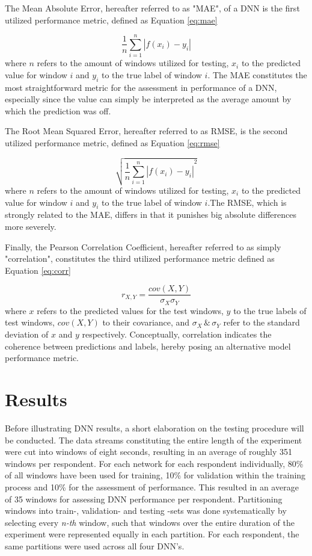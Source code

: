 \documentclass[12pt]{article}
\begin{document}
The Mean Absolute Error, hereafter referred to as "MAE",  of a DNN is the first utilized performance metric, defined as Equation \ref{eq:mae}

\begin{equation}
\label{eq:mae}
\frac{1}{n} \sum^n_{i=1}|f(x_i)-y_i| 
\end{equation}
where $n$ refers to the amount of windows utilized for testing, $x_i$ to the predicted value for window $i$ and $y_i$ to the true label of window $i$.
The MAE constitutes the most straightforward metric for the assessment in performance of a DNN, especially since the value can simply be interpreted as the average amount by which the prediction was off.

The Root Mean Squared Error, hereafter referred to as RMSE, is the second utilized performance metric, defined as Equation \ref{eq:rmse}

\begin{equation}
\label{eq:rmse}
\sqrt{{\frac{1}{n} \sum^n_{i=1}|f(x_i)-y_i|}^2}
\end{equation}
where $n$ refers to the amount of windows utilized for testing, $x_i$ to the predicted value for window $i$ and $y_i$ to the true label of window $i$.The RMSE, which is strongly related to the MAE, differs in that it punishes big absolute differences more severely. 

Finally, the Pearson Correlation Coefficient, hereafter referred to as simply "correlation", constitutes the third utilized performance metric defined as Equation  \ref{eq:corr}

\begin{equation}
\label{eq:corr}
r_{X,Y} = \frac{cov(X,Y)}{\sigma_{X} \sigma_{Y}}
\end{equation}
where $x$ refers to the predicted values for the test windows,  $y$ to the true labels of test windows, $cov(X,Y)$ to their covariance, and $\sigma_{X}\, \& \,\sigma_{Y}$ refer to the standard deviation of $x$ and $y$ respectively.  Conceptually, correlation indicates the coherence between predictions and labels, hereby posing an alternative model performance metric. 

\newpage
\section{Results}
Before illustrating DNN results,  a short elaboration on the testing procedure will be conducted.  The data streams constituting the entire length of the experiment were cut into windows of eight seconds, resulting in an average of roughly 351 windows per respondent. For each network for each respondent individually,  80\% of all windows have been used for training, 10\% for validation within the training process and 10\% for the assessment of performance. This resulted in an average of 35 windows for assessing DNN performance per respondent.  Partitioning windows into train-, validation- and testing -sets was done systematically by selecting every \textit{n-th} window, such that windows over the entire duration of the experiment were represented equally in each partition.  For each respondent, the same partitions were used across all four DNN's.
\end{document}
